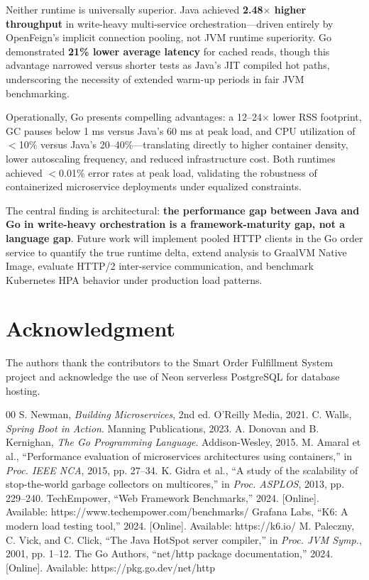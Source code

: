 \documentclass[conference]{IEEEtran}
\begin{document}
Neither runtime is universally superior. Java achieved \textbf{2.48$\times$ higher throughput} in write-heavy multi-service orchestration---driven entirely by OpenFeign's implicit connection pooling, not JVM runtime superiority. Go demonstrated \textbf{21\% lower average latency} for cached reads, though this advantage narrowed versus shorter tests as Java's JIT compiled hot paths, underscoring the necessity of extended warm-up periods in fair JVM benchmarking.

Operationally, Go presents compelling advantages: a 12--24$\times$ lower RSS footprint, GC pauses below 1 ms versus Java's 60 ms at peak load, and CPU utilization of $<$10\% versus Java's 20--40\%---translating directly to higher container density, lower autoscaling frequency, and reduced infrastructure cost. Both runtimes achieved $<$0.01\% error rates at peak load, validating the robustness of containerized microservice deployments under equalized constraints.

The central finding is architectural: \textbf{the performance gap between Java and Go in write-heavy orchestration is a framework-maturity gap, not a language gap}. Future work will implement pooled HTTP clients in the Go order service to quantify the true runtime delta, extend analysis to GraalVM Native Image, evaluate HTTP/2 inter-service communication, and benchmark Kubernetes HPA behavior under production load patterns.

\section*{Acknowledgment}

The authors thank the contributors to the Smart Order Fulfillment System project and acknowledge the use of Neon serverless PostgreSQL for database hosting.

\begin{thebibliography}{00}
 S. Newman, \textit{Building Microservices}, 2nd ed. O'Reilly Media, 2021.
 C. Walls, \textit{Spring Boot in Action}. Manning Publications, 2023.
 A. Donovan and B. Kernighan, \textit{The Go Programming Language}. Addison-Wesley, 2015.
 M. Amaral et al., ``Performance evaluation of microservices architectures using containers,'' in \textit{Proc. IEEE NCA}, 2015, pp. 27--34.
 K. Gidra et al., ``A study of the scalability of stop-the-world garbage collectors on multicores,'' in \textit{Proc. ASPLOS}, 2013, pp. 229--240.
 TechEmpower, ``Web Framework Benchmarks,'' 2024. [Online]. Available: https://www.techempower.com/benchmarks/
 Grafana Labs, ``K6: A modern load testing tool,'' 2024. [Online]. Available: https://k6.io/
 M. Paleczny, C. Vick, and C. Click, ``The Java HotSpot server compiler,'' in \textit{Proc. JVM Symp.}, 2001, pp. 1--12.
 The Go Authors, ``net/http package documentation,'' 2024. [Online]. Available: https://pkg.go.dev/net/http
\end{thebibliography}
\end{document}
